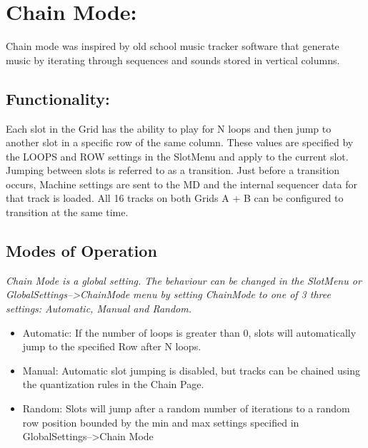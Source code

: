 \chapter{Chain Mode:}
Chain mode was inspired by old school music tracker software that generate music by iterating through sequences and sounds stored in vertical columns.
\section{Functionality:}
Each slot in the Grid has the ability to play for N loops and then jump to another slot in a specific row of the same column.  These values are specified by the LOOPS and ROW settings in the SlotMenu and apply to the current slot. Jumping between slots is referred to as a transition. Just before a transition occurs, Machine settings are sent to the MD and the internal sequencer data for that track is loaded. All 16 tracks on both Grids A + B can be configured to transition at the same time.
\section{Modes of Operation}
\textit{Chain Mode is a global setting. The behaviour can be changed in the SlotMenu or \\GlobalSettings-->ChainMode menu by setting ChainMode to one of 3 three settings: Automatic, Manual and Random.}

\begin{itemize}
	\item Automatic: If the number of loops is greater than 0, slots will automatically jump to the specified Row after N loops.
	\item Manual: Automatic slot jumping is disabled, but tracks can be chained using the quantization rules in the Chain Page.
	\item Random: Slots will jump after a random number of iterations to a random row position bounded by the min and max settings specified in GlobalSettings-->Chain Mode
\end{itemize}


